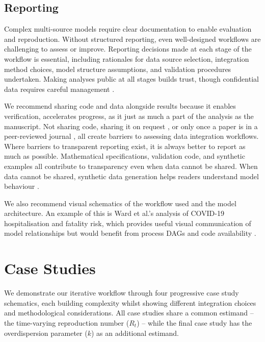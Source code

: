 \documentclass{article}
\begin{document}
\subsection{Reporting} \label{sec:reporting}
Complex multi-source models require clear documentation to enable evaluation and reproduction.
Without structured reporting, even well-designed workflows are challenging to assess or improve.
Reporting decisions made at each stage of the workflow is essential, including rationales for data source selection, integration method choices, model structure assumptions, and validation procedures undertaken.
Making analyses public at all stages builds trust, though confidential data requires careful management \citep{Abbott2021-delta, Abbott2022-prevalence}.

We recommend sharing code and data alongside results because it enables verification, accelerates progress, as it just as much a part of the analysis as the manuscript.
Not sharing code, sharing it on request \citep{Ward2024-sp}, or only once a paper is in a peer-reviewed journal \citep{Fyles2024-qz} , all create barriers to assessing data integration workflows.
Where barriers to transparent reporting exist, it is always better to report as much as possible.
Mathematical specifications, validation code, and synthetic examples all contribute to transparency even when data cannot be shared.
When data cannot be shared, synthetic data generation helps readers understand model behaviour \citep{Mellor2025-norovirus}.

We also recommend visual schematics of the workflow used and the model architecture. An example of this is Ward et al.'s analysis of COVID-19 hospitalisation and fatality risk, which provides useful visual communication of model relationships but would benefit from process DAGs and code availability \citep{Ward2024-sp}.

\section{Case Studies}

We demonstrate our iterative workflow through four progressive case study schematics, each building complexity whilst showing different integration choices and methodological considerations.
All case studies share a common estimand -- the time-varying reproduction number ($R_t$) -- while the final case study has the overdispersion parameter ($k$) as an additional estimand.
\end{document}
